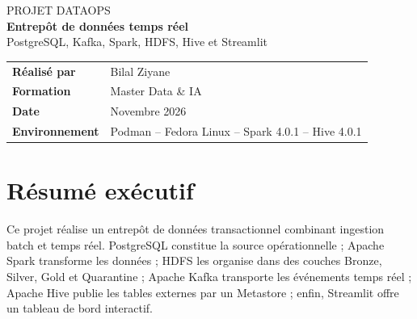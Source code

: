 \documentclass[11pt,a4paper]{report}
\begin{document}
\hypersetup{pageanchor=false}

\begin{titlepage}
\vspace*{2.0cm}
\begin{center}
{\color{white}\Large PROJET DATAOPS}\\[0.5cm]
{\color{white}\fontsize{28}{34}\selectfont\bfseries Entrepôt de données temps réel}\\[0.35cm]
{\color{white}\large PostgreSQL, Kafka, Spark, HDFS, Hive et Streamlit}\\[1.8cm]
\vfill
\begin{tabular}{ll}
\textbf{Réalisé par} & Bilal Ziyane\\
\textbf{Formation} & Master Data \& IA\\
\textbf{Date} & Novembre 2026\\
\textbf{Environnement} & Podman -- Fedora Linux -- Spark 4.0.1 -- Hive 4.0.1
\end{tabular}
\end{center}
\end{titlepage}

\hypersetup{pageanchor=false}
\chapter*{Résumé exécutif}

Ce projet réalise un entrepôt de données transactionnel combinant ingestion
batch et temps réel. PostgreSQL constitue la source opérationnelle ;
Apache Spark transforme les données ; HDFS les organise dans des couches
Bronze, Silver, Gold et Quarantine ; Apache Kafka transporte les événements
temps réel ; Apache Hive publie les tables externes par un Metastore ; enfin,
Streamlit offre un tableau de bord interactif.
\end{document}
